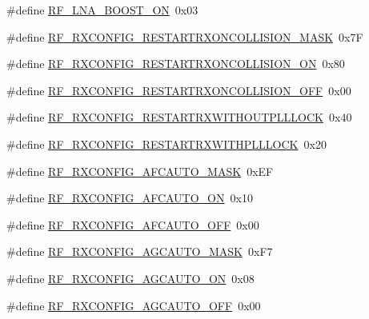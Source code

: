 \begin{DoxyCompactItemize}
\item 
\#define \hyperlink{sx1276Regs-Fsk_8h_ae729805f23edcd913b0442e569f6b151}{R\+F\+\_\+\+L\+N\+A\+\_\+\+B\+O\+O\+S\+T\+\_\+\+ON}~0x03
\item 
\#define \hyperlink{sx1276Regs-Fsk_8h_a5100d76c88dbc8760a74597f945b585c}{R\+F\+\_\+\+R\+X\+C\+O\+N\+F\+I\+G\+\_\+\+R\+E\+S\+T\+A\+R\+T\+R\+X\+O\+N\+C\+O\+L\+L\+I\+S\+I\+O\+N\+\_\+\+M\+A\+SK}~0x7F
\item 
\#define \hyperlink{sx1276Regs-Fsk_8h_ab12ed62cd3ca3d4a4d04717f4e4e1c6e}{R\+F\+\_\+\+R\+X\+C\+O\+N\+F\+I\+G\+\_\+\+R\+E\+S\+T\+A\+R\+T\+R\+X\+O\+N\+C\+O\+L\+L\+I\+S\+I\+O\+N\+\_\+\+ON}~0x80
\item 
\#define \hyperlink{sx1276Regs-Fsk_8h_adcb2e2a2c6ddefb70fa9d95b4091dfbc}{R\+F\+\_\+\+R\+X\+C\+O\+N\+F\+I\+G\+\_\+\+R\+E\+S\+T\+A\+R\+T\+R\+X\+O\+N\+C\+O\+L\+L\+I\+S\+I\+O\+N\+\_\+\+O\+FF}~0x00
\item 
\#define \hyperlink{sx1276Regs-Fsk_8h_afe5d2d617bc8305d563ddf6bdf6f525b}{R\+F\+\_\+\+R\+X\+C\+O\+N\+F\+I\+G\+\_\+\+R\+E\+S\+T\+A\+R\+T\+R\+X\+W\+I\+T\+H\+O\+U\+T\+P\+L\+L\+L\+O\+CK}~0x40
\item 
\#define \hyperlink{sx1276Regs-Fsk_8h_a89ca1a06f70efe28c16331278cfb2e55}{R\+F\+\_\+\+R\+X\+C\+O\+N\+F\+I\+G\+\_\+\+R\+E\+S\+T\+A\+R\+T\+R\+X\+W\+I\+T\+H\+P\+L\+L\+L\+O\+CK}~0x20
\item 
\#define \hyperlink{sx1276Regs-Fsk_8h_aad8947af15105d6b90d75d761439aa23}{R\+F\+\_\+\+R\+X\+C\+O\+N\+F\+I\+G\+\_\+\+A\+F\+C\+A\+U\+T\+O\+\_\+\+M\+A\+SK}~0x\+EF
\item 
\#define \hyperlink{sx1276Regs-Fsk_8h_a1565ab71874bf162f92304ed92a3560c}{R\+F\+\_\+\+R\+X\+C\+O\+N\+F\+I\+G\+\_\+\+A\+F\+C\+A\+U\+T\+O\+\_\+\+ON}~0x10
\item 
\#define \hyperlink{sx1276Regs-Fsk_8h_a46775e0fe6e7798c4f50aa1527a5e454}{R\+F\+\_\+\+R\+X\+C\+O\+N\+F\+I\+G\+\_\+\+A\+F\+C\+A\+U\+T\+O\+\_\+\+O\+FF}~0x00
\item 
\#define \hyperlink{sx1276Regs-Fsk_8h_a20bbc62b9e34c66596d9152d8d1c18ac}{R\+F\+\_\+\+R\+X\+C\+O\+N\+F\+I\+G\+\_\+\+A\+G\+C\+A\+U\+T\+O\+\_\+\+M\+A\+SK}~0x\+F7
\item 
\#define \hyperlink{sx1276Regs-Fsk_8h_a6d9c9a618b195915a59cfffeae490a76}{R\+F\+\_\+\+R\+X\+C\+O\+N\+F\+I\+G\+\_\+\+A\+G\+C\+A\+U\+T\+O\+\_\+\+ON}~0x08
\item 
\#define \hyperlink{sx1276Regs-Fsk_8h_acae238b6c7912d2900ef6f6a66eff67c}{R\+F\+\_\+\+R\+X\+C\+O\+N\+F\+I\+G\+\_\+\+A\+G\+C\+A\+U\+T\+O\+\_\+\+O\+FF}~0x00
\item 

\end{DoxyCompactItemize}
